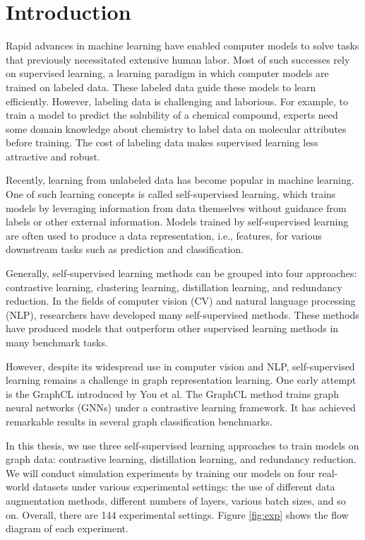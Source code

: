 
\chapter{Introduction}

Rapid advances in machine learning have enabled computer models to solve tasks that previously necessitated extensive human labor. Most of such successes rely on supervised learning, a learning paradigm in which computer models are trained on labeled data. These labeled data guide these models to learn efficiently. However, labeling data is challenging and laborious. For example, to train a model to predict the solubility of a chemical compound, experts need some domain knowledge about chemistry to label data on molecular attributes before training. The cost of labeling data makes supervised learning less attractive and robust.

Recently, learning from unlabeled data has become popular in machine learning. One of such learning concepts is called self-supervised learning, which trains models by leveraging information from data themselves without guidance from labels or other external information. Models trained by self-supervised learning are often used to produce a data representation, i.e., features, for various downstream tasks such as prediction and classification. 

Generally, self-supervised learning methods can be grouped into four approaches: contrastive learning, clustering learning, distillation learning, and redundancy reduction. In the fields of computer vision (CV) \cite{sslcv} and natural language processing (NLP), researchers have developed many self-supervised methods. These methods have produced models that outperform other supervised learning methods in many benchmark tasks. 

However, despite its widespread use in computer vision and NLP, self-supervised learning remains a challenge in graph representation learning. One early attempt is the GraphCL \cite{GraphCL} introduced by You et al.  The GraphCL method trains graph neural networks (GNNs) under a contrastive learning framework. It has achieved remarkable results in several graph classification benchmarks. 

In this thesis, we use three self-supervised learning approaches to train models on graph data: contrastive learning, distillation learning, and redundancy reduction. We will conduct simulation experiments by training our models on four real-world datasets under various experimental settings: the use of different data augmentation methods, different numbers of layers, various batch sizes, and so on. Overall, there are 144 experimental settings. Figure \ref{fig:exp} shows the flow diagram of each experiment.

